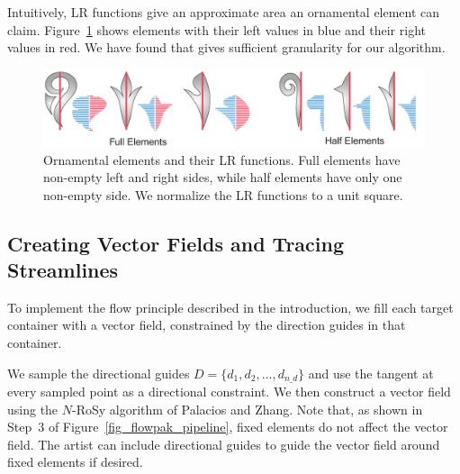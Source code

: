 Intuitively, LR functions give an approximate area an ornamental element can claim.
Figure~\ref{ornamental_shapes_fig} 
shows elements with their left values
in blue and their right values in red. We have found that  gives sufficient
granularity for our algorithm.

\begin{figure}
\centering
\includegraphics[width=1.0\textwidth]{figures/flowpak/ornaments.pdf}
\caption[Ornamental elements and their LR functions]
{\label{ornamental_shapes_fig}
Ornamental elements and their LR functions. Full elements have non-empty
left and right sides, while half elements have only one non-empty side. 
We normalize the LR functions to a unit square.}
\end{figure}

\subsection{Creating Vector Fields and Tracing Streamlines}
\label{flowpak_creating_vector_fields_and_tracing_streamlines}

To implement the flow principle described in the introduction, we fill each target
container with a vector field, constrained by the direction guides in that container.

We sample the directional guides $D = \{ d_{1}, d_{2}, ... , d_{n\text{\_}d}\}$  
and use the tangent at every sampled point as a directional constraint.
We then construct a vector field using the $N$-RoSy algorithm
of Palacios and Zhang\cite{Palacios2007}.  Note that, as shown in 
Step~3 of Figure~\ref{fig_flowpak_pipeline},
fixed elements do not affect the vector field.  
The artist can include directional guides to guide the vector field around fixed elements if desired.

